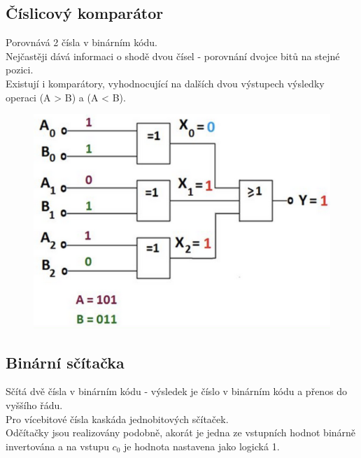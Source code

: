 \subsection{Číslicový komparátor}
Porovnává 2 čísla v binárním kódu. \\
Nejčastěji dává informaci o shodě dvou čísel - porovnání dvojce bitů na stejné pozici.\\
Existují i komparátory, vyhodnocující na dalších dvou výstupech výsledky operaci (A > B) a (A < B).\\
\begin{figure}[h!]
    \centering
    \includegraphics[scale = 0.3]{img/Kompar.png}
\end{figure}

\subsection{Binární sčítačka}
Sčítá dvě čísla v binárním kódu - výsledek je číslo v binárním kódu a přenos do vyššího řádu.\\
Pro vícebitové čísla kaskáda jednobitových sčítaček.\\
Odčítačky jsou realizovány podobně, akorát je jedna ze vstupních hodnot binárně invertována a na vstupu \(c_0\) je hodnota nastavena jako logická 1. \\
